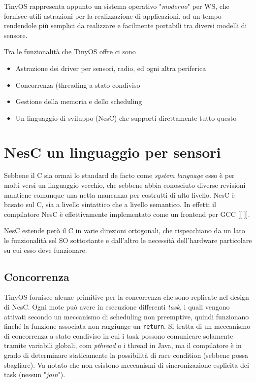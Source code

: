 \documentclass[pdftex,12pt,a4paper,italian,openany]{book}
\begin{document}
TinyOS rappresenta appunto un sistema operativo "\emph{moderno}" per WS, che fornisce 
utili astrazioni per la realizzazione di applicazioni, ad un tempo rendendole più 
semplici da realizzare e facilmente portabili tra diversi modelli di sensore.

Tra le funzionalità che TinyOS offre ci sono
\begin{itemize}

\item{Astrazione dei driver per sensori, radio, ed ogni altra periferica  }

\item{Concorrenza (threading a stato condiviso}

\item{Gestione della memoria e dello scheduling}

\item{Un linguaggio di sviluppo (NesC) che supporti direttamente tutto questo}
\end{itemize}


\section{NesC un linguaggio per sensori}

Sebbene il C sia ormai lo standard de facto come \emph{system language} esso è per molti versi 
un linguaggio vecchio, che sebbene abbia conosciuto diverse revisioni mantiene comunque una 
netta mancanza per costrutti di alto livello. 
NesC è basato sul C, sia a livello sintattico che a livello semantico. 
In effetti il compilatore NesC è effettivamente implementato come un frontend per GCC [[ ]].

NesC estende però il C in varie direzioni ortogonali, che rispecchiano da un lato le funzionalità
sel SO sottostante e dall'altro le necessità dell'hardware particolare su cui esso deve funzionare. 

\subsection{Concorrenza}
TinyOS fornisce alcune primitive per la concorrenza che sono replicate nel design di NesC.
Ogni mote può avere in esecuzione differenti \emph{task}, i quali vengono attivati secondo un 
meccanismo di scheduling non preemptive, quindi funzionano finché la funzione associata non 
raggiunge un \texttt{return}. Si tratta di un meccanismo di concorrenza a stato condiviso in cui 
i task possono comunicare solamente tramite variabili globali, com \emph{pthread} o i thread in 
Java, ma il compilatore è in grado di determinare staticamente la possibilità di race condition 
(sebbene possa sbagliare). Va notato che non esistono meccanismi di sincronizazione esplicita 
dei task (nessun "\emph{join}").
\end{document}
